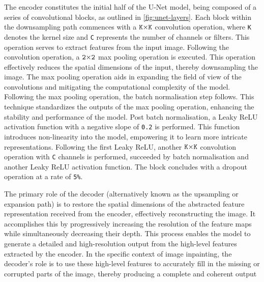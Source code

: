 The encoder constitutes the initial half of the U-Net model, being composed of a series of convolutional blocks, as outlined in \autoref{fig:unet-layers}. Each block within the downsampling path commences with a $\text{\texttt{K}} {\times} \text{\texttt{K}}$ convolution operation, where \texttt{K} denotes the kernel size and \texttt{C} represents the number of channels or filters. This operation serves to extract features from the input image. Following the convolution operation, a $\text{\texttt{2}} {\times} \text{\texttt{2}}$ max pooling operation is executed. This operation effectively reduces the spatial dimensions of the input, thereby downsampling the image. The max pooling operation aids in expanding the field of view of the convolutions and mitigating the computational complexity of the model. Following the max pooling operation, the batch normalisation step follows. This technique standardizes the outputs of the max pooling operation, enhancing the stability and performance of the model. Post batch normalisation, a Leaky ReLU activation function with a negative slope of \texttt{0.2} is performed. This function introduces non-linearity into the model, empowering it to learn more intricate representations. Following the first Leaky ReLU, another $\text{\texttt{K}} {\times} \text{\texttt{K}}$ convolution operation with \texttt{C} channels is performed, succeeded by batch normalisation and another Leaky ReLU activation function. The block concludes with a dropout operation at a rate of \texttt{5\%}.


The primary role of the decoder (alternatively known as the upsampling or expansion path) is to restore the spatial dimensions of the abstracted feature representation received from the encoder, effectively reconstructing the image. It accomplishes this by progressively increasing the resolution of the feature maps while simultaneously decreasing their depth. This process enables the model to generate a detailed and high-resolution output from the high-level features extracted by the encoder. In the specific context of image inpainting, the decoder's role is to use these high-level features to accurately fill in the missing or corrupted parts of the image, thereby producing a complete and coherent output


